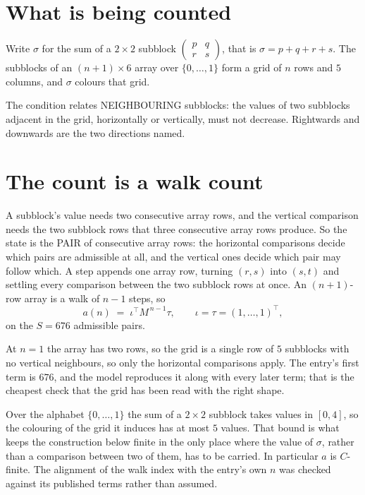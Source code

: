 \documentclass[11pt,a4paper]{article}
\theoremstyle{plain}
\theoremstyle{definition}
\begin{document}
\section{What is being counted}

Write $\sigma$ for the sum of a $2\times2$ subblock
$\begin{pmatrix}p&q\\r&s\end{pmatrix}$, that is $\sigma=p+q+r+s$. The subblocks of an
$(n+1)\times6$ array over $\{0,\dots,1\}$ form a grid of $n$ rows and $5$
columns, and $\sigma$ colours that grid.

The condition relates NEIGHBOURING subblocks: the values of two subblocks adjacent in the grid,
horizontally or vertically, must not decrease. Rightwards and downwards are the two directions named.

\section{The count is a walk count}

A subblock's value needs two consecutive array rows, and the vertical
comparison needs the two subblock rows that three consecutive array rows produce. So the state
is the PAIR of consecutive array rows: the horizontal comparisons decide which pairs are
admissible at all, and the vertical ones decide which pair may follow which. A step appends one
array row, turning $(r,s)$ into $(s,t)$ and settling every comparison between the two subblock
rows at once. An $(n+1)$-row array is a walk of $n-1$ steps, so
\[
a(n)\;=\;\iota^{\!\top}M^{\,n-1}\tau,\qquad\iota=\tau=(1,\dots,1)^{\!\top},
\]
on the $S=676$ admissible pairs.

At $n=1$ the array has two rows, so the grid is a single row of $5$
subblocks with no vertical neighbours, so only the horizontal comparisons apply. The
entry's first term is $676$, and the model reproduces it along with every later term; that
is the cheapest check that the grid has been read with the right shape.

Over the alphabet $\{0,\dots,1\}$ the sum of a $2\times2$ subblock takes values in
$[0,4]$, so the colouring of the grid it induces has at most $5$ values.
That bound is what keeps the construction below finite in the only place where the value of
$\sigma$, rather than a comparison between two of them, has to be carried.
In particular $a$ is $C$-finite. The alignment of the walk index with the entry's own $n$ was
checked against its published terms rather than assumed.
\end{document}
